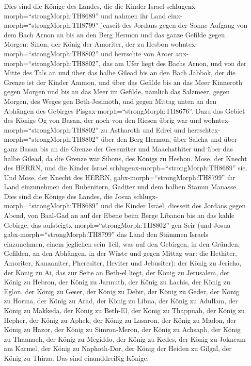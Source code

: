  Dies sind die Könige des Landes, die die Kinder Israel
schlugenx-morph=``strongMorph:TH8689'' und nahmen ihr Land
einx-morph=``strongMorph:TH8799'' jenseit des Jordans gegen der Sonne
Aufgang von dem Bach Arnon an bis an den Berg Hermon und das ganze
Gefilde gegen Morgen:  Sihon, der König der Amoriter, der zu
Hesbon wohntex-morph=``strongMorph:TH8802'' und herrschte von Aroer
anx-morph=``strongMorph:TH8802'', das am Ufer liegt des Bachs Arnon, und
von der Mitte des Tals an und über das halbe Gilead bis an den Bach
Jabbok, der die Grenze ist der Kinder Ammon,  und über das
Gefilde bis an das Meer Kinneroth gegen Morgen und bis an das Meer im
Gefilde, nämlich das Salzmeer, gegen Morgen, des Weges gen
Beth-Jesimoth, und gegen Mittag unten an den Abhängen des Gebirges
Pisgax-morph=``strongMorph:TH8676''.  Dazu das Gebiet des
Königs Og von Basan, der noch von den Riesen übrig war und
wohntex-morph=``strongMorph:TH8802'' zu Astharoth und Edrei 
und herrschtex-morph=``strongMorph:TH8802'' über den Berg Hermon, über
Salcha und über ganz Basan bis an die Grenze der Gessuriter und
Maachathiter und über das halbe Gilead, da die Grenze war Sihons, des
Königs zu Hesbon.  Mose, der Knecht des HERRN, und die
Kinder Israel schlugenx-morph=``strongMorph:TH8689'' sie. Und Mose, der
Knecht des HERRN, gabx-morph=``strongMorph:TH8799'' ihr Land einzunehmen
den Rubenitern, Gaditer und dem halben Stamm Manasse.  Dies
sind die Könige des Landes, die Josua
schlugx-morph=``strongMorph:TH8689'' und die Kinder Israel, diesseit des
Jordans gegen Abend, von Baal-Gad an auf der Ebene beim Berge Libanon
bis an das kahle Gebirge, das aufsteigtx-morph=``strongMorph:TH8802''
gen Seir (und Josua gabx-morph=``strongMorph:TH8799'' das Land den
Stämmen Israels einzunehmen, einem jeglichen sein Teil,  was
auf den Gebirgen, in den Gründen, Gefilden, an den Abhängen, in der
Wüste und gegen Mittag war: die Hethiter, Amoriter, Kanaaniter,
Pheresiter, Heviter und Jebusiter):  der König zu Jericho,
der König zu Ai, das zur Seite an Beth-el liegt,  der König
zu Jerusalem, der König zu Hebron,  der König zu Jarmuth,
der König zu Lachis,  der König zu Eglon, der König zu
Geser,  der König zu Debir, der König zu Geder,
 der König zu Horma, der König zu Arad,  der
König zu Libna, der König zu Adullam,  der König zu
Makkeda, der König zu Beth-El,  der König zu Thappuah, der
König zu Hepher,  der König zu Aphek, der König zu Lasaron,
 der König zu Madon, der König zu Hazor,  der
König zu Simron-Meron, der König zu Achsaph,  der König zu
Thaanach, der König zu Megiddo,  der König zu Kedes, der
König zu Jokneam am Karmel,  der König zu Naphoth-Dor, der
König der Heiden zu Gilgal,  der König zu Thirza. Das sind
einunddreißig Könige.

